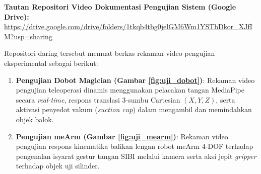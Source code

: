 \begin{center}
\textbf{Tautan Repositori Video Dokumentasi Pengujian Sistem (Google Drive):}\\
\url{https://drive.google.com/drive/folders/1tkqb4tbg0jelGM6Wm1YSTbDkor_XJfIM?usp=sharing}
\end{center}

Repositori daring tersebut memuat berkas rekaman video pengujian eksperimental sebagai berikut:
\begin{enumerate}[label=\arabic*.]
    \item \textbf{Pengujian Dobot Magician (Gambar \ref{fig:uji_dobot})}: Rekaman video pengujian teleoperasi dinamis menggunakan pelacakan tangan MediaPipe secara \textit{real-time}, respons translasi 3-sumbu Cartesian $(X,Y,Z)$, serta aktivasi penyedot vakum (\textit{suction cup}) dalam mengambil dan memindahkan objek balok.
    \item \textbf{Pengujian meArm (Gambar \ref{fig:uji_mearm})}: Rekaman video pengujian respons kinematika balikan lengan robot meArm 4-DOF terhadap pengenalan isyarat gestur tangan SIBI melalui kamera serta aksi jepit \textit{gripper} terhadap objek uji silinder.
\end{enumerate}
